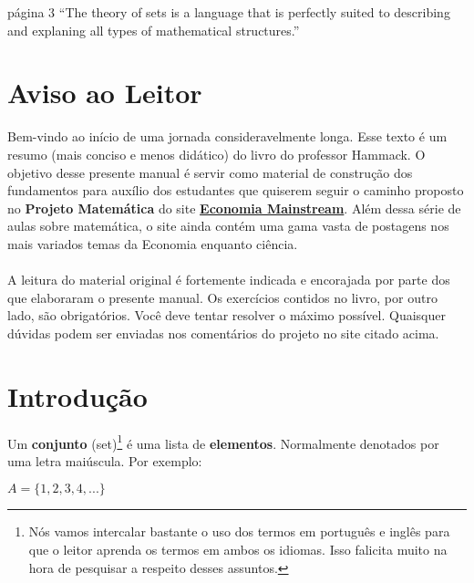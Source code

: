 \documentclass[main.tex]{subfiles}
\begin{document}
\begin{chapquote}{página 3}
	``The theory of sets is a language that is perfectly suited to describing and explaning all types of mathematical structures.''
\end{chapquote}

\section*{Aviso ao Leitor}

Bem-vindo ao início de uma jornada consideravelmente longa. Esse texto é um resumo (mais conciso e menos didático) do livro do professor Hammack. O objetivo desse presente manual é servir como material de construção dos fundamentos para auxílio dos estudantes que quiserem seguir o caminho proposto no \textbf{Projeto Matemática} do site \href{https://economiamainstream.com.br/artigo/matematica/}{\textbf{Economia Mainstream}}. Além dessa série de aulas sobre matemática, o site ainda contém uma gama vasta de postagens nos mais variados temas da Economia enquanto ciência.
\\~\\
A leitura do material original é fortemente indicada e encorajada por parte dos que elaboraram o presente manual. Os exercícios contidos no livro, por outro lado, são obrigatórios. Você deve tentar resolver o máximo possível. Quaisquer dúvidas podem ser enviadas nos comentários do projeto no site citado acima.

\section{Introdução}

Um \textbf{conjunto} (set)\footnote{Nós vamos intercalar bastante o uso dos termos em português e inglês para que o leitor aprenda os termos em ambos os idiomas. Isso falicita muito na hora de pesquisar a respeito desses assuntos.} é uma lista de \textbf{elementos}. Normalmente denotados por uma letra maiúscula. Por exemplo:

\begin{center}
	$ A = \{1 , 2 , 3 , 4 , ... \} $
\end{center}
\end{document}
